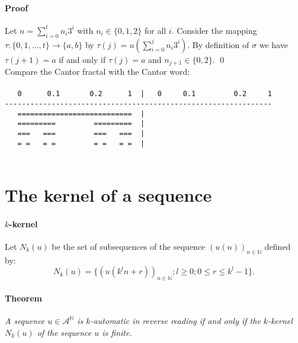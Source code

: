 \documentclass{article}
\begin{document}
\paragraph{Proof} Let $n = \sum_{i = 0}^t n_i 3^i$ with $n_i \in \{0, 1, 2\}$
for all $i$. Consider the mapping $\tau: \{0, 1, ..., t\} \rightarrow \{a, b\}$
by $\tau(j) = u(\sum_{i = 0}^j n_i 3^i)$. By definition of $\sigma$ we have 
$\tau(j + 1) = a$ if and only if $\tau(j) = a$ and $n_{j + 1} \in \{0, 2\}$.
\qed\\
Compare the Cantor fractal with the Cantor word:\\
\\
\verb#   0      0.1       0.2      1  |   0     0.1         0.2     1#\\
\verb#---------------------------------------------------------------#\\
\verb#   ===========================  |               #\\
\verb#   =========         =========  |      # { } { } { } { } { } { } { } { } { } { } { } { }\\
\verb#   ===   ===         ===   ===  |   #\\
\verb#   = =   = =         = =   = =  |  #\\
\\

\section*{The kernel of a sequence}
\paragraph{$k$-kernel} Let $N_k(u)$ be the set of subsequences of the sequence
$(u(n))_{n \in \mathbb{N}}$ defined by:
\begin{displaymath}
N_k(u) = \{(u(k^ln + r))_{n \in \mathbb{N}}; l \ge 0; 0 \le r \le k^l - 1\}.
\end{displaymath}

\paragraph{Theorem} \emph{A sequence $u \in \mathcal{A}^\mathbb{N}$ is 
$k$-automatic in reverse reading if and only if the $k$-kernel $N_k(u)$ of the 
sequence $u$ is finite.}
\end{document}

